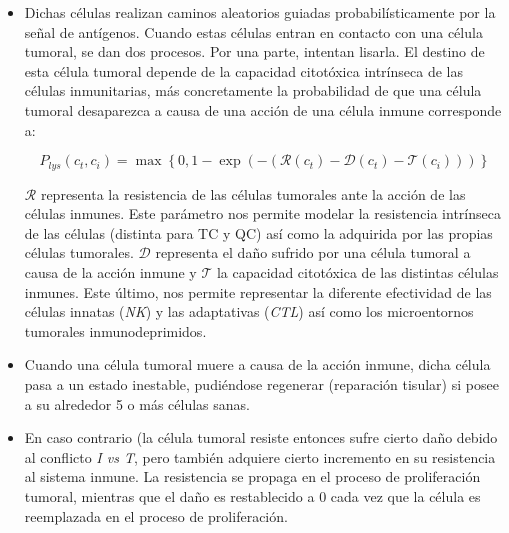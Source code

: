 \begin{itemize}
 


\item Dichas células realizan caminos aleatorios guiadas probabilísticamente por la señal de antígenos. Cuando estas células entran en contacto con una célula tumoral, se dan dos procesos.  Por una parte, intentan lisarla. El destino de esta célula tumoral depende de la capacidad citotóxica intrínseca de las células inmunitarias, más concretamente la probabilidad de que una célula tumoral desaparezca a causa de una acción de una célula inmune corresponde a: 

\begin{equation}
    P_{lys}(c_t, c_i) = \max \left\lbrace 0, 1 - \exp{\left(- (\mathcal{R}(c_t) - \mathcal{D}(c_t) - \mathcal{T}(c_i)) \right)} \right\rbrace
\end{equation}

$\mathcal{R}$ representa la resistencia de las células tumorales ante la acción de las células inmunes. Este parámetro nos permite modelar la resistencia intrínseca de las células (distinta para TC y QC) así como la adquirida por las propias células tumorales. $\mathcal{D}$ representa el daño sufrido por una célula tumoral a causa de la acción inmune y $\mathcal{T}$ la capacidad citotóxica de las distintas células inmunes. Este último, nos permite representar la diferente efectividad de las células innatas (\textit{NK}) y las adaptativas (\textit{CTL}) así como los microentornos tumorales inmunodeprimidos.\\

\item Cuando una célula tumoral muere a causa de la acción inmune, dicha célula pasa a un estado inestable, pudiéndose regenerar (reparación tisular) si posee a su alrededor 5 o más células sanas.\\

\item En caso contrario (la célula tumoral resiste entonces sufre cierto daño debido al conflicto \textit{I vs T}, pero también adquiere cierto incremento en su resistencia al sistema inmune. La resistencia se propaga en el proceso de proliferación tumoral, mientras que el daño es restablecido a $0$ cada vez que la célula es reemplazada en el proceso de proliferación.\\  



\end{itemize}
